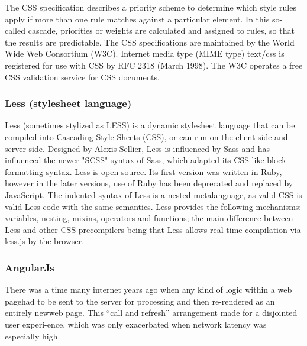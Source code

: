 The CSS specification describes a priority scheme to determine which style rules apply if more than one rule matches against a particular element. In this so-called cascade, priorities or weights are calculated and assigned to rules, so that the results are predictable.
The CSS specifications are maintained by the World Wide Web Consortium (W3C). Internet media type (MIME type) text/css is registered for use with CSS by RFC 2318 (March 1998). The W3C operates a free CSS validation service for CSS documents.

\subsubsection*{Less (stylesheet language)}
Less (sometimes stylized as LESS) is a dynamic stylesheet language that can be compiled into Cascading Style Sheets (CSS), or can run on the client-side and server-side. Designed by Alexis Sellier, Less is influenced by Sass and has influenced the newer "SCSS" syntax of Sass, which adapted its CSS-like block formatting syntax. Less is open-source. Its first version was written in Ruby, however in the later versions, use of Ruby has been deprecated and replaced by JavaScript. The indented syntax of Less is a nested metalanguage, as valid CSS is valid Less code with the same semantics. Less provides the following mechanisms: variables, nesting, mixins, operators and functions; the main difference between Less and other CSS precompilers being that Less allows real-time compilation via less.js by the browser.

\subsubsection*{AngularJs}
There was a time many internet years ago when any kind of logic within a web pagehad to be sent to the server for processing and then re-rendered as an entirely newweb page. This “call and refresh” arrangement made for a disjointed user experi-ence, which was only exacerbated when network latency was especially high.  
\newline

